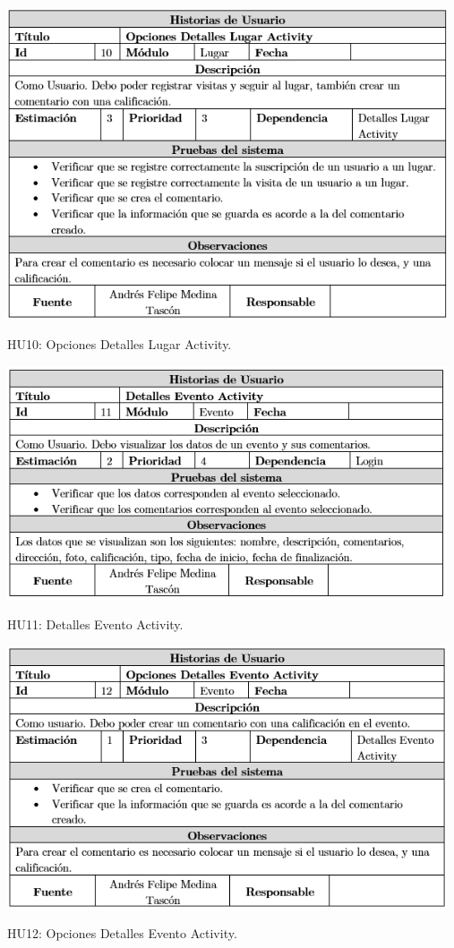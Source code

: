 \documentclass[12pt,letterpaper,openany]{book}
\begin{document}
\begin{table}[H]
\centering
\includegraphics[width=13cm]{./imagenes/HU/HU10}
\caption{HU10: Opciones Detalles Lugar Activity.}
\end{table}

\begin{table}[H]
\centering
\includegraphics[width=13cm]{./imagenes/HU/HU11}
\caption{HU11: Detalles Evento Activity.}
\end{table}

\begin{table}[H]
\centering
\includegraphics[width=13cm]{./imagenes/HU/HU12}
\caption{HU12: Opciones Detalles Evento Activity.}
\end{table}
\end{document}
